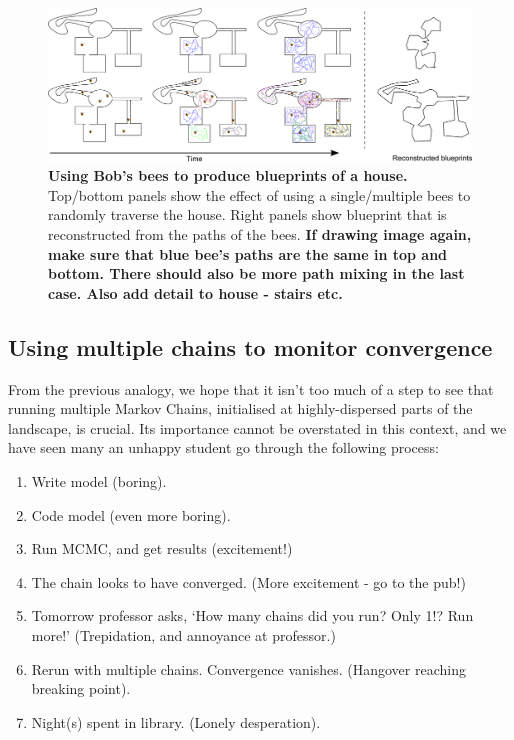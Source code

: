\documentclass[11pt,fullpage]{book}
\begin{document}
\begin{figure}
\centerline{\includegraphics[width=1\textwidth]{metropolisHastings_bobBees.pdf}}
\caption{\textbf{Using Bob's bees to produce blueprints of a house.} Top/bottom panels show the effect of using a single/multiple bees to randomly traverse the house. Right panels show blueprint that is reconstructed from the paths of the bees. \textbf{If drawing image again, make sure that blue bee's paths are the same in top and bottom. There should also be more path mixing in the last case. Also add detail to house - stairs etc.}}\label{fig:metropolisHastings_bobBees}
\end{figure}

\subsection{Using multiple chains to monitor convergence}
From the previous analogy, we hope that it isn't too much of a step to see that running multiple Markov Chains, initialised at highly-dispersed parts of the landscape, is crucial. Its importance cannot be overstated in this context, and we have seen many an unhappy student go through the following process:

\begin{enumerate}
\item Write model (boring).
\item Code model (even more boring).
\item Run MCMC, and get results (excitement!)
\item The chain looks to have converged. (More excitement - go to the pub!)
\item Tomorrow professor asks, `How many chains did you run? Only 1!? Run more!' (Trepidation, and annoyance at professor.)
\item Rerun with multiple chains. Convergence vanishes. (Hangover reaching breaking point).
\item Night(s) spent in library. (Lonely desperation).
\end{enumerate}
\end{document}
